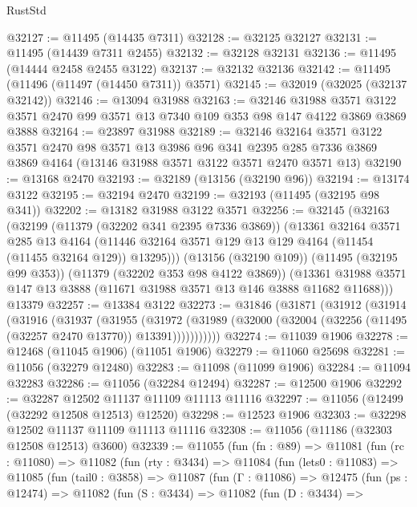 \begin{lexlean}{RustStd}
\begin{coremodule}
@32127 := @11495 (@14435 @7311)
@32128 := @32125 @32127
@32131 := @11495 (@14439 @7311 @2455)
@32132 := @32128 @32131
@32136 := @11495 (@14444 @2458 @2455 @3122)
@32137 := @32132 @32136
@32142 := @11495 (@11496 (@11497 (@14450 @7311)) @3571)
@32145 := @32019 (@32025 (@32137 @32142))
@32146 := @13094 @31988
@32163 := @32146
    @31988
    @3571
    @3122
    @3571
    @2470
    @99
    @3571
    @13
    @7340
    @109
    @353
    @98
    @147
    @4122
    @3869
    @3869
    @3888
@32164 := @23897 @31988
@32189 := @32146
    @32164
    @3571
    @3122
    @3571
    @2470
    @98
    @3571
    @13
    @3986
    @96
    @341
    @2395
    @285
    @7336
    @3869
    @3869
    @4164
    (@13146 @31988 @3571 @3122 @3571 @2470 @3571 @13)
@32190 := @13168 @2470
@32193 := @32189 (@13156 (@32190 @96))
@32194 := @13174 @3122
@32195 := @32194 @2470
@32199 := @32193 (@11495 (@32195 @98 @341))
@32202 := @13182 @31988 @3122 @3571
@32256 := @32145
    (@32163
      (@32199
        (@11379 (@32202 @341 @2395 @7336 @3869))
        (@13361
          @32164
          @3571
          @285
          @13
          @4164
          (@11446 @32164 @3571 @129 @13 @129 @4164 (@11454 (@11455 @32164 @129)) @13295)))
      (@13156 (@32190 @109))
      (@11495 (@32195 @99 @353))
      (@11379 (@32202 @353 @98 @4122 @3869))
      (@13361 @31988 @3571 @147 @13 @3888 (@11671 @31988 @3571 @13 @146 @3888 @11682 @11688)))
    @13379
@32257 := @13384 @3122
@32273 := @31846
    (@31871
      (@31912
        (@31914
          (@31916
            (@31937
              (@31955
                (@31972
                  (@31989 (@32000 (@32004 (@32256 (@11495 (@32257 @2470 @13770)) @13391)))))))))))
@32274 := @11039 @1906
@32278 := @12468 (@11045 @1906) (@11051 @1906)
@32279 := @11060 @25698
@32281 := @11056 (@32279 @12480)
@32283 := @11098 (@11099 @1906)
@32284 := @11094 @32283
@32286 := @11056 (@32284 @12494)
@32287 := @12500 @1906
@32292 := @32287 @12502 @11137 @11109 @11113 @11116
@32297 := @11056 (@12499 (@32292 @12508 @12513) @12520)
@32298 := @12523 @1906
@32303 := @32298 @12502 @11137 @11109 @11113 @11116
@32308 := @11056 (@11186 (@32303 @12508 @12513) @3600)
@32339 := @11055
    (fun (fn : @89) =>
    @11081
      (fun (rc : @11080) =>
      @11082
        (fun (rty : @3434) =>
        @11084
          (fun (lets0 : @11083) =>
          @11085
            (fun (tail0 : @3858) =>
            @11087
              (fun (Γ : @11086) =>
              @12475
                (fun (ps : @12474) =>
                @11082
                  (fun (S : @3434) =>
                  @11082
                    (fun (D : @3434) =>

\end{coremodule}
\end{lexlean}
